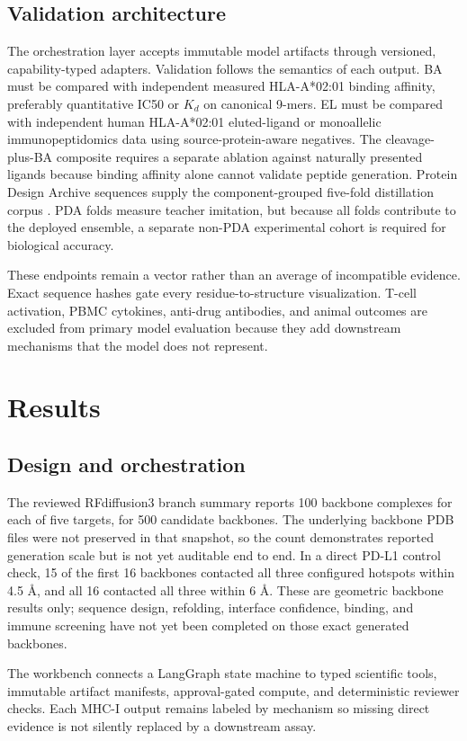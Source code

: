 \documentclass{article}
\begin{document}
\subsection{Validation architecture}
The orchestration layer accepts immutable model artifacts through versioned, capability-typed adapters. Validation follows the semantics of each output. BA must be compared with independent measured HLA-A*02:01 binding affinity, preferably quantitative IC50 or $K_d$ on canonical 9-mers. EL must be compared with independent human HLA-A*02:01 eluted-ligand or monoallelic immunopeptidomics data using source-protein-aware negatives. The cleavage-plus-BA composite requires a separate ablation against naturally presented ligands because binding affinity alone cannot validate peptide generation. Protein Design Archive sequences supply the component-grouped five-fold distillation corpus \cite{chronowska2025pda}. PDA folds measure teacher imitation, but because all folds contribute to the deployed ensemble, a separate non-PDA experimental cohort is required for biological accuracy.

These endpoints remain a vector rather than an average of incompatible evidence. Exact sequence hashes gate every residue-to-structure visualization. T-cell activation, PBMC cytokines, anti-drug antibodies, and animal outcomes are excluded from primary model evaluation because they add downstream mechanisms that the model does not represent.

\section{Results}
\subsection{Design and orchestration}
The reviewed RFdiffusion3 branch summary reports 100 backbone complexes for each of five targets, for 500 candidate backbones. The underlying backbone PDB files were not preserved in that snapshot, so the count demonstrates reported generation scale but is not yet auditable end to end. In a direct PD-L1 control check, 15 of the first 16 backbones contacted all three configured hotspots within 4.5 \AA, and all 16 contacted all three within 6 \AA. These are geometric backbone results only; sequence design, refolding, interface confidence, binding, and immune screening have not yet been completed on those exact generated backbones.

The workbench connects a LangGraph state machine to typed scientific tools, immutable artifact manifests, approval-gated compute, and deterministic reviewer checks. Each MHC-I output remains labeled by mechanism so missing direct evidence is not silently replaced by a downstream assay.
\end{document}
